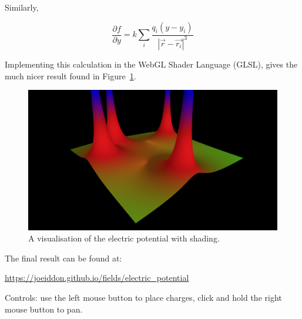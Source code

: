 \documentclass{article} %
\begin{document}
Similarly,

$$\frac{\partial f}{\partial y} = k\sum_{i}\frac{q_i(y-y_i)}{|\vec{r}-\vec{r_i}|^3}$$

Implementing this calculation in the WebGL Shader Language (GLSL), gives the much nicer result found in Figure~\ref{fig:shading}.

\begin{figure}
\includegraphics[width=\linewidth]{shading.png}
\caption{A visualisation of the electric potential with shading.}
\label{fig:shading}
\end{figure}

\vfill

The final result can be found at:

\begin{center}
\url{https://joeiddon.github.io/fields/electric_potential}
\end{center}

Controls: use the left mouse button to place charges, click and hold the right mouse button to pan.
\end{document}
